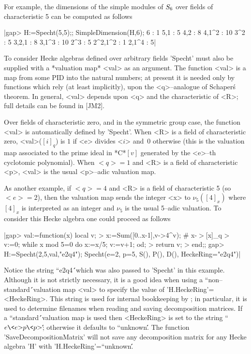 For example, the dimensions of the simple modules of $S_6$
over fields of characteristic 5 can be computed as follows\:

|gap> H:=Specht(5,5);; SimpleDimension(H,6);
6       : 1
5,1     : 5
4,2     : 8
4,1^2   : 10
3^2     : 5
3,2,1   : 8
3,1^3   : 10
2^3     : 5
2^2,1^2 : 1
2,1^4   : 5|


To consider Hecke algebras defined over arbitrary fields 'Specht' must 
also be supplied with a *valuation map* <val> as an argument. The 
function <val> is a map from some PID into the natural numbers; at 
present it is needed only by functions which rely (at least implicitly),
upon the <q>--analogue of Schaper\'s theorem. In general, <val> depends 
upon <q> and the characteristic of <R>; full details can be found in [JM2].

Over fields of characteristic zero, and in the symmetric group case, the 
function <val> is automatically defined by 'Specht'. When <R> is a field 
of characteristic zero, <val>($[i]_q$) is $1$ if <e> divides <$i$> and~$0$ 
otherwise (this is the valuation map associated to the prime ideal in 
*C*$[v]$ generated by the <e>--th cyclotomic polynomial). When $<q>=1$
and <R> is a field of characteristic <p>, <val> is the usual <p>--adic 
valuation map.

As another example, if $<q>=4$ and <R> is a field of characteristic 5 
(so $<e>=2$), then the valuation map sends the integer <x> to 
$\nu_5([4]_x)$ where $[4]_x$ is interpreted as an integer and $\nu_5$ is 
the usual 5--adic valuation. To consider this Hecke algebra one could 
proceed as follows\:

|gap> val:=function(x) local v;
>       x:=Sum([0..x-1],v->4^v);  # x-${>}$[x]\_q
>       v:=0; while x mod 5=0 do x:=x/5; v:=v+1; od;
>       return v;
>     end;;
gap> H:=Specht(2,5,val,"e2q4");
Specht(e=2, p=5, S(), P(), D(), HeckeRing="e2q4")|

Notice the string ``e2q4\'\'\ which was also passed to 'Specht' in this
example. Although it is not strictly necessary, it is a good idea when 
using a ``non--standard\'\'\ valuation map <val> to specify the value 
of 'H.HeckeRing'=<HeckeRing>. This string is used for internal 
bookkeeping by \Specht; in particular, it is used to determine filenames 
when reading and saving decomposition matrices. If a ``standard\'\'\ 
valuation map is used then <HeckeRing> is set to the string 
``$e{\<}e{>}p{\<}p{>}$\'\'; otherwise it defaults to ``unknown\'\'. The
function 'SaveDecompositionMatrix' will not save any decomposition 
matrix for any Hecke algebra 'H' with 'H.HeckeRing'=``unknown\'\'.

